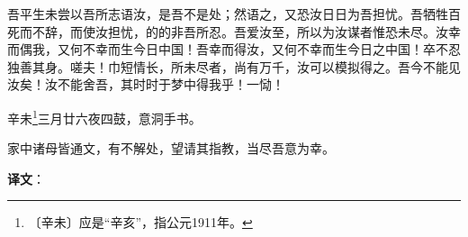 \documentclass[12pt,UTF-8,openany,a4]{ctexbook}
\begin{document}
\begin{large}
    吾平生未尝以吾所志语汝，是吾不是处；然语之，又恐汝日日为吾担忧。吾牺牲百死而不辞，而使汝担忧，的的非吾所忍。吾爱汝至，所以为汝谋者惟恐未尽。汝幸而偶我，又何不幸而生今日中国！吾幸而得汝，又何不幸而生今日之中国！卒不忍独善其身。嗟夫！巾短情长，所未尽者，尚有万千，汝可以模拟得之。吾今不能见汝矣！汝不能舍吾，其时时于梦中得我乎！一恸！
    
    辛未\footnote{〔辛未〕\yiwen 应是“辛亥”，指公元1911年。}三月廿六夜四鼓，意洞手书。
    
    家中诸母皆通文，有不解处，望请其指教，当尽吾意为幸。

\end{large}


\newpage

\begin{Large}
   \noindent \textbf{译文}：
\end{Large}

\vspace{1em}
\end{document}
